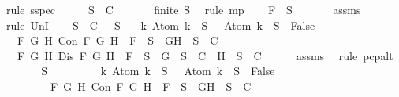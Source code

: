 \begin{isabellebody}
\ {\isacharparenleft}rule\ sspec{\isacharparenright}\isanewline
\ \ \isamarkupfalse%
\ \isamarkupfalse%
\ {\isachardoublequoteopen}{\isacharquery}S\ {\isasymin}\ C{\isachardoublequoteclose}\ \isanewline
\ \ \ \ \isamarkupfalse%
\ {\isacartoucheopen}finite\ {\isacharquery}S{\isacartoucheclose}\ \isamarkupfalse%
\ {\isacharparenleft}rule\ mp{\isacharparenright}\isanewline
\ \ \isamarkupfalse%
\ {\isachardoublequoteopen}F\ {\isasymin}\ {\isacharquery}S{\isachardoublequoteclose}\ \isanewline
\ \ \ \ \isamarkupfalse%
\ assms{\isacharparenleft}{}{\isacharparenright}\ \isamarkupfalse%
\ {\isacharparenleft}rule\ UnI{}{\isacharparenright}\isanewline
\ \ \isamarkupfalse%
\ {\isachardoublequoteopen}{\isasymforall}S\ {\isasymin}\ C{\isachardot}\ {\isasymbottom}\ {\isasymnotin}\ S\isanewline
\ \ {\isasymand}\ {\isacharparenleft}{\isasymforall}k{\isachardot}\ Atom\ k\ {\isasymin}\ S\ {\isasymlongrightarrow}\ \isactrlbold {\isasymnot}\ {\isacharparenleft}Atom\ k{\isacharparenright}\ {\isasymin}\ S\ {\isasymlongrightarrow}\ False{\isacharparenright}\isanewline
\ \ {\isasymand}\ {\isacharparenleft}{\isasymforall}F\ G\ H{\isachardot}\ Con\ F\ G\ H\ {\isasymlongrightarrow}\ F\ {\isasymin}\ S\ {\isasymlongrightarrow}\ {\isacharbraceleft}G{\isacharcomma}H{\isacharbraceright}\ {\isasymunion}\ S\ {\isasymin}\ C{\isacharparenright}\isanewline
\ \ {\isasymand}\ {\isacharparenleft}{\isasymforall}F\ G\ H{\isachardot}\ Dis\ F\ G\ H\ {\isasymlongrightarrow}\ F\ {\isasymin}\ S\ {\isasymlongrightarrow}\ {\isacharbraceleft}G{\isacharbraceright}\ {\isasymunion}\ S\ {\isasymin}\ C\ {\isasymor}\ {\isacharbraceleft}H{\isacharbraceright}\ {\isasymunion}\ S\ {\isasymin}\ C{\isacharparenright}{\isachardoublequoteclose}\isanewline
\ \ \ \ \isamarkupfalse%
\ assms{\isacharparenleft}{}{\isacharparenright}\ \isamarkupfalse%
\ {\isacharparenleft}rule\ pcp{\isacharunderscore}alt{}{\isacharparenright}\isanewline
\ \ \isamarkupfalse%
\ \isamarkupfalse%
\ {\isachardoublequoteopen}{\isasymbottom}\ {\isasymnotin}\ {\isacharquery}S\isanewline
\ \ \ \ \ \ \ \ {\isasymand}\ {\isacharparenleft}{\isasymforall}k{\isachardot}\ Atom\ k\ {\isasymin}\ {\isacharquery}S\ {\isasymlongrightarrow}\ \isactrlbold {\isasymnot}\ {\isacharparenleft}Atom\ k{\isacharparenright}\ {\isasymin}\ {\isacharquery}S\ {\isasymlongrightarrow}\ False{\isacharparenright}\isanewline
\ \ \ \ \ \ \ \ {\isasymand}\ {\isacharparenleft}{\isasymforall}F\ G\ H{\isachardot}\ Con\ F\ G\ H\ {\isasymlongrightarrow}\ F\ {\isasymin}\ {\isacharquery}S\ {\isasymlongrightarrow}\ {\isacharbraceleft}G{\isacharcomma}H{\isacharbraceright}\ {\isasymunion}\ {\isacharquery}S\ {\isasymin}\ C{\isacharparenright}\isanewline

\end{isabellebody}
